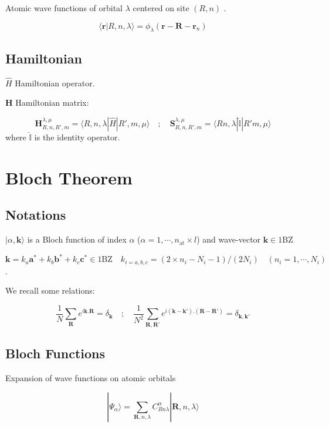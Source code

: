 \documentclass{article}
\newcommand{\bra}[1]{\langle #1|}
\newcommand{\ket}[1]{|#1\rangle}
\newcommand{\braket}[2]{\langle #1|#2\rangle}
\newcommand{\op}[1]{\hat{#1}}
\begin{document}
\noindent
Atomic wave functions of orbital $\lambda$ centered on site $(R,n)$ .

\[\braket{\mathbf{r}}{R,n,\lambda} = \phi_{\lambda}(\mathbf{r}-\mathbf{R}-\mathbf{r}_n)\]




\subsection{Hamiltonian}

\noindent
$\op{H}$ Hamiltonian operator.

\noindent
$\bm{H}$ Hamiltonian matrix:

\noindent
\[ \displaystyle \bm{H}_{R,n,R',m}^{\lambda, \mu}=\bra{ R,n,\lambda} \op{H} \ket{ R',m,\mu } \quad ;\quad
\bm{S}_{R,n,R',m}^{\lambda, \mu}=\bra{ Rn,\lambda} \op{\mathbb{I}} \ket{R' m,\mu }\]
where $\op{\mathbb{I}}$ is the identity operator.


\section{Bloch Theorem}

\subsection{Notations}

\noindent $\ket{\alpha, \mathbf{k} }$ is a Bloch function of index
$\alpha$ ($\alpha=1, \cdots, n_{\text{at}} \times l$) and wave-vector $\mathbf{k}\in \text{1BZ}$


\noindent
  $ \mathbf{k}=  k_a \mathbf{a}^*+k_b \mathbf{b}^*+k_c \mathbf{c}^* \in \mbox{1BZ}
\quad k_{i=a,b,c}= (2\times n_i -N_i -1)/(2 N_i) \quad (n_i=1,\cdots,N_i)$ .

\noindent
We recall some relations:

\[ \frac{1}{N}\sum_{\mathbf{R}} e^{i\mathbf{k}.\mathbf{R}}=\delta_{\mathbf{k}} 
\quad ; \quad
\frac{1}{N^2}\sum_{\mathbf{R},\mathbf{R}'} 
e^{i(\mathbf{k}-\mathbf{k'}).(\mathbf{R}-\mathbf{R}')}=\delta_{\mathbf{k}, 
\mathbf{k}'} \]


\subsection{Bloch Functions}

\noindent
Expansion of wave functions on atomic orbitals

\[\displaystyle \ket{\Psi_{\alpha}}=\sum_{\mathbf{R},n,\lambda} C_{R n  \lambda}^{\alpha} \ket{\mathbf{R},n,\lambda }\]
\end{document}
